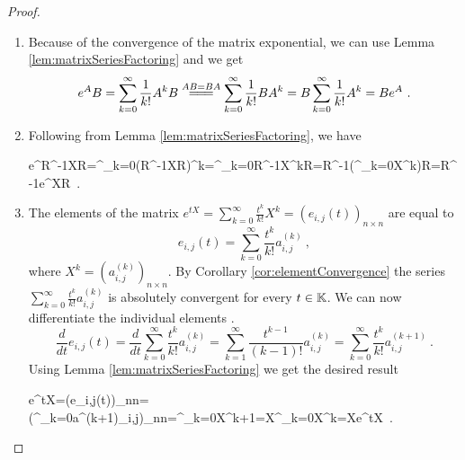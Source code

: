 \begin{proof}
	\begin{enumerate}
		\item
		Because of the convergence of the matrix exponential, we can use Lemma \ref{lem:matrixSeriesFactoring} and we get
		$$e^{A}B=\sum^\infty_{k=0}\frac{1}{k!}A^{k}B\stackrel{AB=BA}{=\joinrel=\joinrel=}\sum^\infty_{k=0}\frac{1}{k!}BA^{k}=B\sum^\infty_{k=0}\frac{1}{k!}A^{k}=Be^{A}\ .$$
		
		\item Following from Lemma \ref{lem:matrixSeriesFactoring}, we have 
		\begin{longeq}
			e^{R^{-1}XR}=\sum^\infty_{k=0}(R^{-1}XR)^{k}=\sum^\infty_{k=0}R^{-1}X^{k}R=R^{-1}\left(\sum^\infty_{k=0}X^{k}\right)R=R^{-1}e^{X}R\ . 
		\end{longeq}

		\item The elements of the matrix $e^{tX}=\sum^\infty_{k=0}\frac{t^k}{k!}X^{k}=(e_{i,j}(t))_{n\times n}$ are equal to
		$$e_{i,j}(t)=\sum^\infty_{k=0}\frac{t^k}{k!}a^{(k)}_{i,j}\ ,$$
		where $X^k=(a^{(k)}_{i,j})_{n\times n}$. By Corollary \ref{cor:elementConvergence} the series $\sum^\infty_{k=0}\frac{t^k}{k!}a^{(k)}_{i,j}$ is absolutely convergent for every $t\in\mathbb{K}$. We can now differentiate the individual elements \citep[see][Věta 8.2.2]{Pick}.
		$$\frac{d}{dt}e_{i,j}(t)=\frac{d}{dt}\sum^\infty_{k=0}\frac{t^k}{k!}a^{(k)}_{i,j}=\sum^\infty_{k=1}\frac{t^{k-1}}{(k-1)!}a^{(k)}_{i,j}=\sum^\infty_{k=0}\frac{t^{k}}{k!}a^{(k+1)}_{i,j}\ .$$ 
		Using Lemma \ref{lem:matrixSeriesFactoring} we get the desired result
		\begin{longeq}
			e^{tX}=\left(e_{i,j}(t)\right)_{n\times n}=\left(\sum^\infty_{k=0}a^{(k+1)}_{i,j}\right)_{n\times n}=\sum^\infty_{k=0}X^{k+1}=X\sum^\infty_{k=0}X^{k}=Xe^{tX}\ .
		\end{longeq}


\end{enumerate}
\end{proof}
